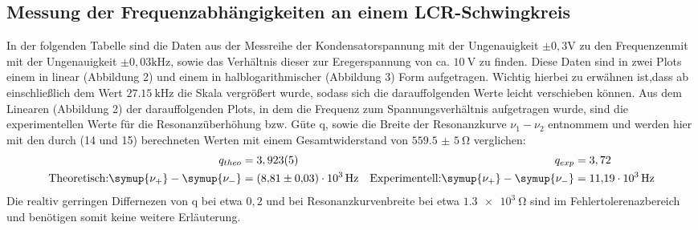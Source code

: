 \subsection[underline]{Messung der Frequenzabhängigkeiten an einem LCR-Schwingkreis}
In der folgenden Tabelle sind die Daten aus der Messreihe der Kondensatorspannung  mit der Ungenauigkeit $\pm{0,3}$$\si{\volt}$ zu den Frequenzenmit mit der Ungenauigkeit $\pm{0,03}$$\si{\kilo\hertz}$, sowie das Verhältnis dieser zur Eregerspannung von ca. $\SI{10}{\volt}$ zu finden.
Diese Daten sind in zwei Plots einem in linear (Abbildung 2) und einem in halblogarithmischer (Abbildung 3) Form aufgetragen.
Wichtig hierbei zu erwähnen ist,dass ab einschließlich dem Wert $\SI{27,15}{\kilo\hertz}$ die Skala vergrößert wurde, sodass sich die darauffolgenden Werte leicht verschieben können.
Aus dem Linearen (Abbildung 2) der darauffolgenden Plots, in dem die Frequenz zum Spannungsverhältnis aufgetragen wurde, sind die experimentellen Werte für die Resonanzüberhöhung bzw. Güte q, sowie die Breite der Resonanzkurve $\nu_1 - \nu_2$ entnommem und werden hier mit den durch (14 und 15) berechneten Werten mit einem Gesamtwiderstand von $\SI{559,5(5)}{\ohm}$ verglichen:
\begin{align*}
q_{theo} &= \si{3,923(5)} & q_{exp} &= \si{3,72}\\
\text{Theoretisch:} \symup{\nu_+} - \symup{\nu_-} &= \SI{8,81(3)e3}{\hertz} & \text{Experimentell:} \symup{\nu_+} - \symup{\nu_-} &= \SI{11,19e3}{\hertz}
\end{align*}
Die realtiv gerringen Differnezen von q bei etwa $0,2$ und bei Resonanzkurvenbreite bei etwa $\SI{1,3e3}{\ohm}$ sind im Fehlertolerenazbereich und benötigen somit keine weitere Erläuterung.
